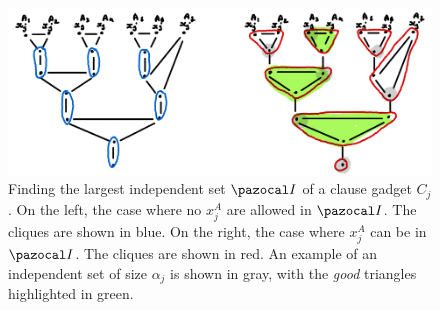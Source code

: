 \begin{figure}
    \includegraphics[width=\textwidth]{figures/indset-td-best.png}
    \caption{Finding the largest independent set $\I$ of a clause gadget $C_j$. On the left, the case where no $x_j^A$ are allowed in $\I$. The cliques are shown in blue. On the right, the case where $x_j^A$ can be in $\I$. The cliques are shown in red. An example of an independent set of size $\alpha_j$ is shown in gray, with the \textit{good} triangles highlighted in green.}
    \label{fig:indset-td-best}
\end{figure}